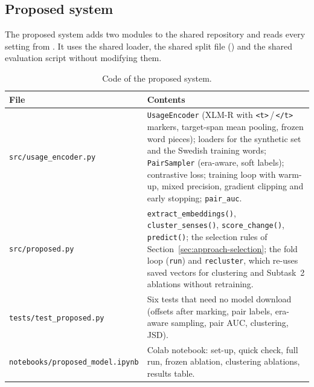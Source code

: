 \subsection{Proposed system}
\label{sec:impl-proposed}

The proposed system adds two modules to the shared repository and reads every
setting from . It uses the shared loader, the shared
split file () and the shared evaluation script
without modifying them.

\begin{table}[ht]
\centering
\small
\begin{tabularx}{\linewidth}{@{}lX@{}}
\toprule
\textbf{File} & \textbf{Contents}\\
\midrule
\texttt{src/usage\_encoder.py} & \texttt{UsageEncoder} (XLM-R with \texttt{<t>}\,/\,\texttt{</t>} markers, target-span mean pooling, frozen word pieces); loaders for the synthetic set and the Swedish training words; \texttt{PairSampler} (era-aware, soft labels); contrastive loss; training loop with warm-up, mixed precision, gradient clipping and early stopping; \texttt{pair\_auc}.\\
\texttt{src/proposed.py} & \texttt{extract\_embeddings()}, \texttt{cluster\_senses()}, \texttt{score\_change()}, \texttt{predict()}; the selection rules of Section~\ref{sec:approach-selection}; the fold loop (\texttt{run}) and \texttt{recluster}, which re-uses saved vectors for clustering and Subtask~2 ablations without retraining.\\
\texttt{tests/test\_proposed.py} & Six tests that need no model download (offsets after marking, pair labels, era-aware sampling, pair AUC, clustering, JSD).\\
\texttt{notebooks/proposed\_model.ipynb} & Colab notebook: set-up, quick check, full run, frozen ablation, clustering ablations, results table.\\
\bottomrule
\end{tabularx}
\caption{Code of the proposed system.}
\label{tab:impl-proposed}
\end{table}

